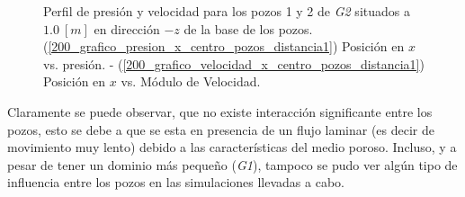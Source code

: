 \documentclass[10pt,a4paper,final]{article}
\begin{document}
\begin{figure}[H]
   \centering
   \hspace{0.1\linewidth}
    \caption{Perfil de presión y velocidad para los pozos 1 y 2 de \emph{G2} situados a $1.0~[m]$ en dirección $-z$ de la base de los pozos. (\ref{200_grafico_presion_x_centro_pozos_distancia1}) Posición en $x$ vs. presión. - (\ref{200_grafico_velocidad_x_centro_pozos_distancia1}) Posición en $x$ vs. Módulo de Velocidad.}
   \label{200_grafico_velocidad_presion_centro_pozos_distancia1}                %
\end{figure}
Claramente se puede observar, que no existe interacción significante entre los pozos, esto se debe a que se esta en presencia de un flujo laminar (es decir de movimiento muy lento) debido a las características del medio poroso. Incluso, y a pesar de tener un dominio más pequeño (\emph{G1}), tampoco se pudo ver algún tipo de influencia entre los pozos en las simulaciones llevadas a cabo.
\end{document}
